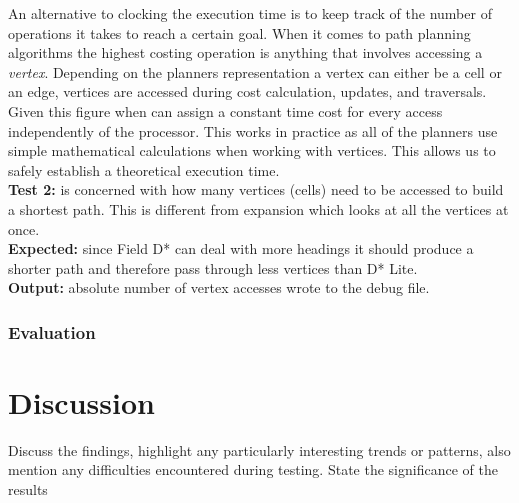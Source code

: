 \noindent
An alternative to clocking the execution time is to keep track of the number of operations it takes to reach a certain goal. When it comes to path planning algorithms the highest costing operation is anything that involves accessing a \textit{vertex}. Depending on the planners representation a vertex can either be a cell or an edge, vertices are accessed during cost calculation, updates, and traversals. Given this figure when can assign a constant time cost for every access independently of the processor. This works in practice as all of the planners use simple mathematical calculations when working with vertices. This allows us to safely establish a theoretical execution time. \\   

\noindent
\textbf{Test 2:} is concerned with how many vertices (cells) need to be accessed to build a shortest path. This is different from expansion which looks at all the vertices at once.\\

\noindent
\textbf{Expected:} since Field D* can deal with more headings it should produce a shorter path and therefore pass through less vertices than D* Lite.\\

\noindent
\textbf{Output:} absolute number of vertex accesses wrote to the debug file.

\subsubsection{Evaluation}

\newpage

\section{Discussion}
Discuss the findings, highlight any particularly interesting trends or patterns, also mention any difficulties encountered during testing. State the significance of the results